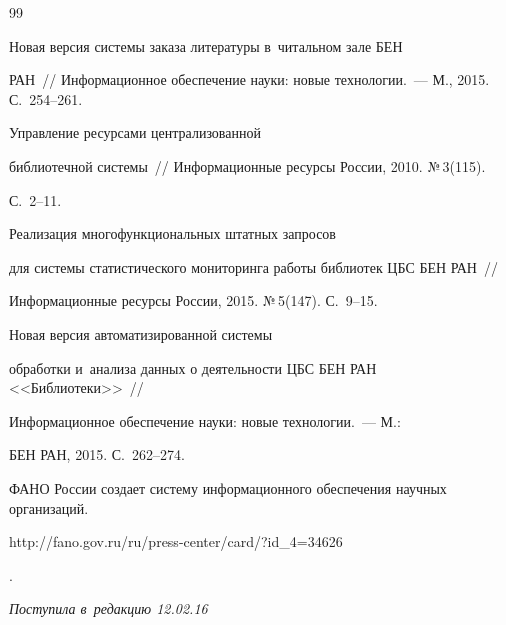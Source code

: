 {{\begin{thebibliography}{99}


 Новая версия системы заказа литературы в~читальном зале БЕН 


РАН~/\!\!/ Информационное обеспечение науки: новые технологии.~--- М., 2015. С.~254--261.




 Управление ресурсами централизованной 


библиотечной системы~/\!\!/ Информационные ресурсы России, 2010. №\,3(115).  


С.~2--11.




 Реализация многофункциональных штатных запросов 


для системы статистического мониторинга работы библиотек ЦБС БЕН РАН~/\!\!/ 


Информационные ресурсы России, 2015. №\,5(147). С.~9--15.




 Новая версия автоматизированной системы 


обработки и~анализа данных о деятельности ЦБС БЕН РАН <<Библиотеки>>~/\!\!/ 


Информационное обеспечение науки: новые технологии.~--- М.: 


БЕН РАН, 2015. С.~262--274.




ФАНО России создает систему информационного обеспечения научных организаций. {\sf 


http://fano.gov.ru/ru/press-center/card/?id\_4=34626}.


     \end{thebibliography}


} }








\vspace*{-3pt}





\hfill{\small\textit{Поступила в~редакцию 12.02.16}}














